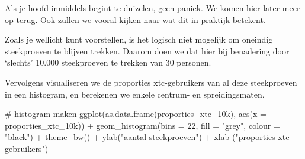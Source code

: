 \documentclass[
  letterpaper,
  DIV=11,
  numbers=noendperiod]{scrreprt}
\newenvironment{Shaded}{\begin{snugshade}}{\end{snugshade}}
\newcommand{\AttributeTok}[1]{\textcolor[rgb]{0.40,0.45,0.13}{#1}}
\newcommand{\CommentTok}[1]{\textcolor[rgb]{0.37,0.37,0.37}{#1}}
\newcommand{\ConstantTok}[1]{\textcolor[rgb]{0.56,0.35,0.01}{#1}}
\newcommand{\DecValTok}[1]{\textcolor[rgb]{0.68,0.00,0.00}{#1}}
\newcommand{\FunctionTok}[1]{\textcolor[rgb]{0.28,0.35,0.67}{#1}}
\newcommand{\NormalTok}[1]{\textcolor[rgb]{0.00,0.23,0.31}{#1}}
\newcommand{\OtherTok}[1]{\textcolor[rgb]{0.00,0.23,0.31}{#1}}
\newcommand{\SpecialCharTok}[1]{\textcolor[rgb]{0.37,0.37,0.37}{#1}}
\newcommand{\StringTok}[1]{\textcolor[rgb]{0.13,0.47,0.30}{#1}}
\begin{document}
Als je hoofd inmiddels begint te duizelen, geen paniek. We komen hier
later meer op terug. Ook zullen we vooral kijken naar wat dit in
praktijk betekent.

Zoals je wellicht kunt voorstellen, is het logisch niet mogelijk om
oneindig steekproeven te blijven trekken. Daarom doen we dat hier bij
benadering door `slechts' 10.000 steekproeven te trekken van 30
personen.

\begin{Shaded}
\end{Shaded}

Vervolgens visualiseren we de proporties xtc-gebruikers van al deze
steekproeven in een histogram, en berekenen we enkele centrum- en
spreidingsmaten.

\begin{Shaded}
\begin{Highlighting}[]
\CommentTok{\# histogram maken}
\FunctionTok{ggplot}\NormalTok{(}\FunctionTok{as.data.frame}\NormalTok{(proporties\_xtc\_10k), }
       \FunctionTok{aes}\NormalTok{(}\AttributeTok{x =}\NormalTok{ proporties\_xtc\_10k)) }\SpecialCharTok{+}
  \FunctionTok{geom\_histogram}\NormalTok{(}\AttributeTok{bins =} \DecValTok{22}\NormalTok{, }\AttributeTok{fill =} \StringTok{"grey"}\NormalTok{, }\AttributeTok{colour =} \StringTok{"black"}\NormalTok{) }\SpecialCharTok{+}  
  \FunctionTok{theme\_bw}\NormalTok{() }\SpecialCharTok{+}
  \FunctionTok{ylab}\NormalTok{(}\StringTok{"aantal steekproeven"}\NormalTok{) }\SpecialCharTok{+}
  \FunctionTok{xlab}\NormalTok{ (}\StringTok{"proporties xtc{-}gebruikers"}\NormalTok{)}
\end{Highlighting}
\end{Shaded}
\end{document}
